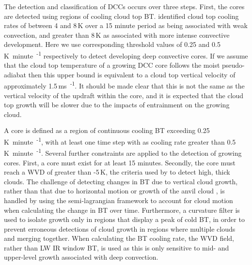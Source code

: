 The detection and classification of DCCs occurs over three steps.
First, the cores are detected using regions of cooling cloud top BT.
\citet{roberts_nowcasting_2003} identified cloud top cooling rates of between 4 and 8\,\unit{K} over a 15 minute period as being associated with weak convection, and greater than 8\,\unit{K} as associated with more intense convective development.
Here we use corresponding threshold values of 0.25 and 0.5\,\unit{K minute\textsuperscript{-1}} respectively to detect developing deep convective cores.
If we assume that the cloud top temperature of a growing DCC core follows the moist pseudo-adiabat then this upper bound is equivalent to a cloud top vertical velocity of approximately 1.5\,\unit{ms\textsuperscript{-1}}.
It should be made clear that this is not the same as the vertical velocity of the updraft within the core, and it is expected that the cloud top growth will be slower due to the impacts of entrainment on the growing cloud.

A core is defined as a region of continuous cooling BT exceeding 0.25\,\unit{K minute\textsuperscript{-1}}, with at least one time step with as cooling rate greater than 0.5\,\unit{K minute\textsuperscript{-1}}.
Several further constraints are applied to the detection of growing cores.
First, a core must exist for at least 15 minutes.
Secondly, the core must reach a WVD of greater than -5\,\unit{K}, the criteria used by \citet{muller_role_2018} to detect high, thick clouds.
The challenge of detecting changes in BT due to vertical cloud growth, rather than that due to horizontal motion or growth of the anvil cloud \citep{hartung_intercomparison_2013}, is handled by using the semi-lagrangian framework to account for cloud motion when calculating the change in BT over time.
Furthermore, a curvature filter is used to isolate growth only in regions that display a peak of cold BT, in order to prevent erroneous detections of cloud growth in regions where multiple clouds and merging together.
When calculating the BT cooling rate, the WVD field, rather than LW IR window BT, is used as this is only sensitive to mid- and upper-level growth associated with deep convection.


